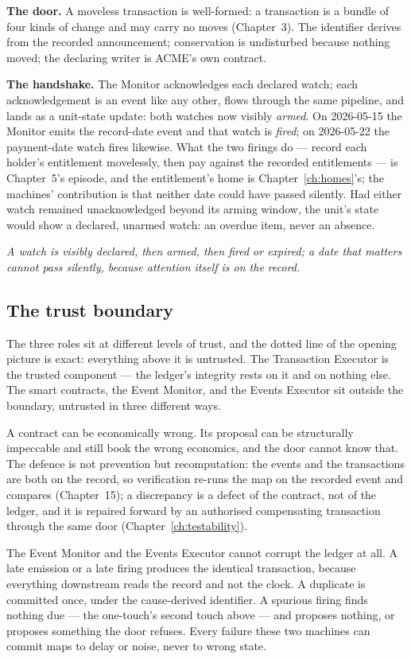 \documentclass[11pt,a4paper]{article}
\begin{document}
\textbf{The door.} A moveless transaction is well-formed: a transaction is a
bundle of four kinds of change and may carry no moves (Chapter~3). The
identifier derives from the recorded announcement; conservation is undisturbed
because nothing moved; the declaring writer is ACME's own contract.

\textbf{The handshake.} The Monitor acknowledges each declared watch; each
acknowledgement is an event like any other, flows through the same pipeline,
and lands as a unit-state update: both watches now visibly \emph{armed}. On
2026-05-15 the Monitor emits the record-date event and that watch is
\emph{fired}; on 2026-05-22 the payment-date watch fires likewise. What the two
firings do --- record each holder's entitlement movelessly, then pay against
the recorded entitlements --- is Chapter~5's episode, and the entitlement's
home is Chapter~\ref{ch:homes}'s; the machines' contribution is that neither
date could have passed silently. Had either watch remained unacknowledged
beyond its arming window, the unit's state would show a declared, unarmed
watch: an overdue item, never an absence.

\emph{A watch is visibly declared, then armed, then fired or expired; a date
that matters cannot pass silently, because attention itself is on the record.}

\subsection{The trust boundary}

The three roles sit at different levels of trust, and the dotted line of the
opening picture is exact: everything above it is untrusted. The Transaction
Executor is the trusted component --- the ledger's integrity rests on it and on
nothing else. The smart contracts, the Event Monitor, and the Events Executor
sit outside the boundary, untrusted in three different ways.

A contract can be economically wrong. Its proposal can be structurally
impeccable and still book the wrong economics, and the door cannot know that.
The defence is not prevention but recomputation: the events and the
transactions are both on the record, so verification re-runs the map on the
recorded event and compares (Chapter~15); a discrepancy is a defect of the
contract, not of the ledger, and it is repaired forward by an authorised compensating transaction
through the same door (Chapter~\ref{ch:testability}).

The Event Monitor and the Events Executor cannot corrupt the ledger at all. A
late emission or a late firing produces the identical transaction, because
everything downstream reads the record and not the clock. A duplicate is
committed once, under the cause-derived identifier. A spurious firing finds
nothing due --- the one-touch's second touch above --- and proposes nothing, or
proposes something the door refuses. Every failure these two machines can
commit maps to delay or noise, never to wrong state.
\end{document}
